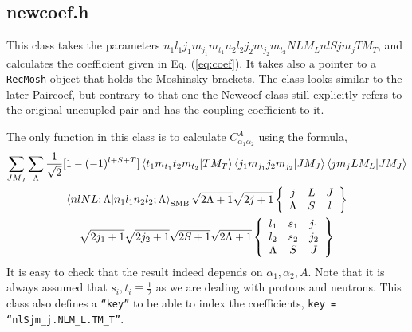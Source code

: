 \documentclass[10pt]{article}
\begin{document}
\subsection{newcoef.h}
This class takes the parameters $n_1 l_1 j_1 m_{j_1} m_{t_1} n_2 l_2 j_2 
m_{j_2} m_{t_2} N L M_L n l S j m_j T M_T$, and calculates the coefficient given 
in Eq. (\ref{eq:coef}). It takes also a pointer to a \texttt{RecMosh} object 
that holds the Moshinsky brackets.  The class looks similar to the later 
Paircoef, but contrary to that one the Newcoef class still explicitly refers to 
the original uncoupled pair and has the coupling coefficient to it.

The only function in this class is to 
calculate $C_{\alpha_1 \alpha_2}^{A}$ using the formula,
\begin{multline}
	\sum_{J M_J} \sum_{\Lambda} 
	\frac{1}{\sqrt{2}} [ 1 - (-1)^{l+S+T}] \braket{ t_1 m_{t_1} t_2 m_{t_2} | T M_T }
	\braket{ j_1 m_{j_1} j_2 m_{j_2} | J M_J}
	\braket{ j m_j L M_L | J M_J } \\
	\braket{ n l N L; \Lambda | n_1 l_1 n_2 l_2 ; \Lambda}_{\textrm{SMB}}
	\sqrt{2 \Lambda + 1} \sqrt{ 2j+1}
	\left\{
	\begin{array}{ccc}
		j & L & J \\
		\Lambda & S & l
	\end{array}
	\right\} \\
	\sqrt{2j_1 + 1} \sqrt{2j_2 + 1} \sqrt{ 2S + 1} \sqrt{ 2 \Lambda + 1}
	\left\{
	\begin{array}{ccc}
		l_1 & s_1 & j_1 \\
		l_2 & s_2 & j_2 \\
		\Lambda & S & J \\
	\end{array}
	\right\}
\end{multline}
It is easy to check that the result indeed depends on $\alpha_1, \alpha_2, A$. Note that it is always assumed that $s_i,t_i \equiv \frac{1}{2}$ as we are dealing with protons and neutrons.
This class also defines a \texttt{``key''} to be able to index the coefficients, \texttt{key = ``nlSjm\_j.NLM\_L.TM\_T''}.
\end{document}
